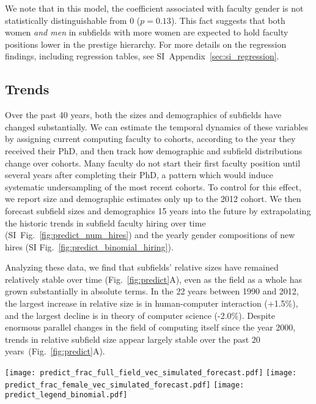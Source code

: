 \documentclass[reprint, twocolumn, aps, nofootinbib, superscriptaddress, longbibliography]{revtex4-1}
\begin{document}
We note that in this model, the coefficient associated with faculty gender is not statistically distinguishable from 0 ($p = 0.13$). This fact suggests that both women \emph{and men} in subfields with more women are expected to hold faculty positions lower in the prestige hierarchy. For more details on the regression findings, including regression tables, see SI~Appendix~\ref{sec:si_regression}. 

\subsection{Trends} 

Over the past 40 years, both the sizes and demographics of subfields have changed substantially. We can estimate the temporal dynamics of these variables by assigning current computing faculty to cohorts, according to the year they received their PhD, and then track how demographic and subfield distributions change over cohorts. Many faculty do not start their first faculty position until several years after completing their PhD, a pattern which would induce systematic undersampling of the most recent cohorts. To control for this effect, we report size and demographic estimates only up to the 2012 cohort. We then forecast subfield sizes and demographics 15 years into the future by extrapolating the historic trends in subfield faculty hiring over time (SI~Fig.~\ref{fig:predict_num_hires}) and the yearly gender compositions of new hires (SI Fig.~\ref{fig:predict_binomial_hiring}). 

Analyzing these data, we find that subfields’ relative sizes have remained relatively stable over time (Fig.~\ref{fig:predict}A), even as the field as a whole has grown substantially in absolute terms. In the 22 years between 1990 and 2012, the largest increase in relative size is in human-computer interaction (+1.5\%), and the largest decline is in theory of computer science (-2.0\%). Despite enormous parallel changes in the field of computing itself since the year 2000, trends in relative subfield size appear largely stable over the past 20 years~(Fig.~\ref{fig:predict}A). 


\begin{figure*}[t]
\texttt{[image: predict\_frac\_full\_field\_vec\_simulated\_forecast.pdf]} 
\texttt{[image: predict\_frac\_female\_vec\_simulated\_forecast.pdf]} 
\texttt{[image: predict\_legend\_binomial.pdf]} 
\caption{(A) Yearly subfield size relative to computing as a whole for 1990 to 2012 and (B) cumulative fraction of faculty that are women from 1990 to 2012, for each of the eight subfields of computing, along with 95\% confidence interval forecasts, projected out to 2027, showing that we may expect the bimodal distribution of gender across subfields to continue into the foreseeable future.}\label{fig:predict} 
\end{figure*} 
\end{document}
